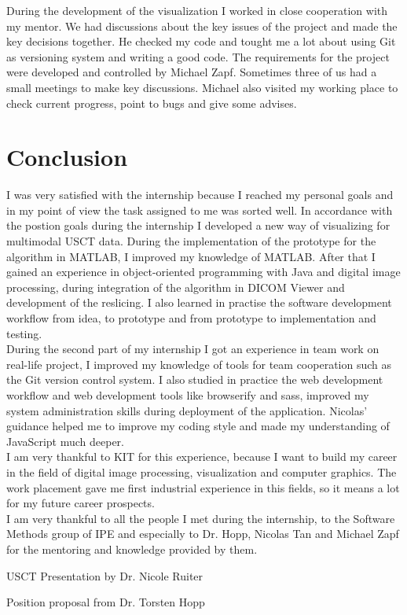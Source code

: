 \documentclass[english]{article}
\begin{document}
During the development of the visualization I worked in close cooperation with my mentor. We had discussions about the key issues of the project and made the key decisions together. He checked my code and tought me a lot about using Git as versioning system and writing a good code. The requirements for the project were developed and controlled by Michael Zapf. Sometimes three of us had a small meetings to make key discussions. Michael also visited my working place to check current progress, point to bugs and give some advises.

\section{Conclusion}

I was very satisfied with the internship because I reached my personal goals and in my point of view the task assigned to me was sorted well. In accordance with the postion goals during the internship I developed a new way of visualizing for multimodal USCT data. During the implementation of the prototype for the algorithm in MATLAB, I improved my knowledge of MATLAB. After that I gained an experience in object-oriented programming with Java and digital image processing, during integration of the algorithm in DICOM Viewer and development of the reslicing. I also learned in practise the software development workflow from idea, to prototype and from prototype to implementation and testing.\\

During the second part of my internship I got an experience in team work on real-life project, I improved my knowledge of tools for team cooperation such as the Git version control system. I also studied in practice the web development workflow and web development tools like browserify and sass, improved my system administration skills during deployment of the application. Nicolas' guidance helped me to improve my coding style and made my understanding of JavaScript much deeper.\\

I am very thankful to KIT for this experience, because I want to build my career in the field of digital image processing, visualization and computer graphics. The work placement gave me first industrial experience in this fields, so it means a lot for my future career prospects.\\

I am very thankful to all the people I met during the internship, to the Software Methods group of IPE and especially to Dr. Hopp, Nicolas Tan and Michael Zapf for the mentoring and knowledge provided by them.

\newpage
\begin{thebibliography}{1}

    USCT Presentation by Dr. Nicole Ruiter
   
    Position proposal from Dr. Torsten Hopp

\end{thebibliography}
\end{document}
